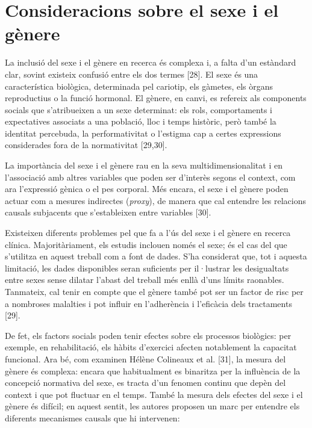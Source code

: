 \documentclass[CAT]{TFUOC}%
\begin{document}
\section{Consideracions sobre el sexe i el gènere}\label{consideracions-sobre-el-sexe-i-el-guxe8nere}

La inclusió del sexe i el gènere en recerca és complexa i, a falta d'un estàndard clar, sovint existeix confusió entre els dos termes {[}28{]}. El sexe és una característica biològica, determinada pel cariotip, els gàmetes, els òrgans reproductius o la funció hormonal. El gènere, en canvi, es refereix als components socials que s'atribueixen a un sexe determinat: els rols, comportaments i expectatives associats a una població, lloc i temps històric, però també la identitat percebuda, la performativitat o l'estigma cap a certes expressions considerades fora de la normativitat {[}29,30{]}.

La importància del sexe i el gènere rau en la seva multidimensionalitat i en l'associació amb altres variables que poden ser d'interès segons el context, com ara l'expressió gènica o el pes corporal. Més encara, el sexe i el gènere poden actuar com a mesures indirectes (\emph{proxy}), de manera que cal entendre les relacions causals subjacents que s'estableixen entre variables {[}30{]}.

Existeixen diferents problemes pel que fa a l'ús del sexe i el gènere en recerca clínica. Majoritàriament, els estudis inclouen només el sexe; és el cas del que s'utilitza en aquest treball com a font de dades. S'ha considerat que, tot i aquesta limitació, les dades disponibles seran suficients per il·lustrar les desigualtats entre sexes sense dilatar l'abast del treball més enllà d'uns límits raonables. Tanmateix, cal tenir en compte que el gènere també pot ser un factor de risc per a nombroses malalties i pot influir en l'adherència i l'eficàcia dels tractaments {[}29{]}.

De fet, els factors socials poden tenir efectes sobre els processos biològics: per exemple, en rehabilitació, els hàbits d'exercici afecten notablement la capacitat funcional. Ara bé, com examinen Hélène Colineaux et al. {[}31{]}, la mesura del gènere és complexa: encara que habitualment es binaritza per la influència de la concepció normativa del sexe, es tracta d'un fenomen continu que depèn del context i que pot fluctuar en el temps. També la mesura dels efectes del sexe i el gènere és difícil; en aquest sentit, les autores proposen un marc per entendre els diferents mecanismes causals que hi intervenen:
\end{document}
